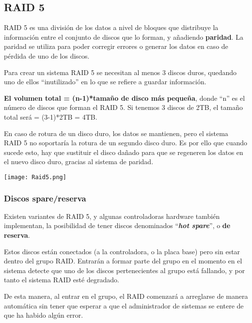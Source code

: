 \subsection{RAID 5}

RAID 5 es una división de los datos a nivel de bloques que distribuye la información entre el conjunto de discos que lo forman, y añadiendo \textbf{paridad}. La paridad se utiliza para poder corregir errores o generar los datos en caso de pérdida de uno de los discos.

Para crear un sistema RAID 5 se necesitan al menos 3 discos duros, quedando uno de ellos “inutilizado” en lo que se refiere a guardar información.

\textbf{El volumen total = (n-1)*tamaño de disco más pequeña}, donde “n” es el número de discos que forman el RAID 5. Si tenemos 3 discos de 2TB, el tamaño total será = (3-1)*2TB = 4TB.

En caso de rotura de un disco duro, los datos se mantienen, pero el sistema RAID 5 no soportaría la rotura de un segundo disco duro. Es por ello que cuando sucede esto, hay que sustituir el disco dañado para que se regeneren los datos en el nuevo disco duro, gracias al sistema de paridad.

\begin{center}
    \texttt{[image: Raid5.png]}
    \vspace{-15pt}
\end{center}

\subsubsection{Discos spare/reserva}

Existen variantes de RAID 5, y algunas controladoras hardware también implementan, la posibilidad de tener discos denominados “\textbf{\textit{hot spare}}”, o \textbf{de reserva}.

Estos discos están conectados (a la controladora, o la placa base) pero sin estar dentro del grupo RAID. Entrarán a formar parte del grupo en el momento en el sistema detecte que uno de los discos pertenecientes al grupo está fallando, y por tanto el sistema RAID esté degradado.

De esta manera, al entrar en el grupo, el RAID comenzará a arreglarse de manera automática sin tener que esperar a que el administrador de sistemas se entere de que ha habido algún error.


